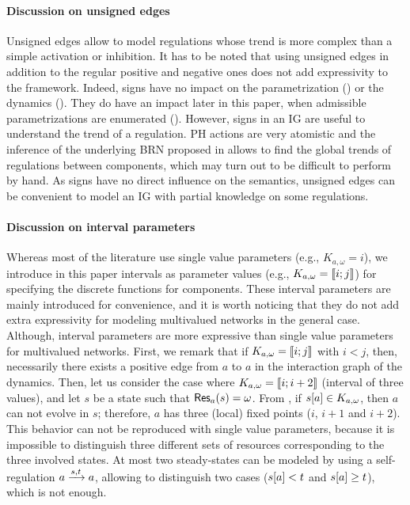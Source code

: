 \paragraph{Discussion on unsigned edges}
Unsigned edges allow to model regulations whose trend is more complex than a simple activation or inhibition.
It has to be noted that using unsigned edges in addition to the regular positive and negative ones does not add expressivity to the framework.
Indeed, signs have no impact on the parametrization () or the dynamics ().
They do have an impact later in this paper, when admissible parametrizations are enumerated ().
However, signs in an IG are useful to understand the trend of a regulation.
PH actions are very atomistic and the inference of the underlying BRN proposed in 
allows to find the global trends of regulations between components,
which may turn out to be difficult to perform by hand.
As signs have no direct influence on the semantics, unsigned edges can be convenient to model an IG with partial knowledge on some regulations.

\paragraph{Discussion on interval parameters}
Whereas most of the literature use single value parameters (e.g., $K_{a,\omega} = i$), we introduce
in this paper intervals as parameter values (e.g., $K_{a,\omega} = \llbracket i ; j \rrbracket$) for specifying
the discrete functions for components.
These interval parameters are mainly introduced for convenience, and it is worth noticing that they
do not add extra expressivity for modeling multivalued networks in the general case.
Although, interval parameters are more expressive than single value parameters for multivalued networks.
First, we remark that if  $K_{a,\omega} = \llbracket i ; j \rrbracket$ with $i < j$, then, necessarily there exists
a positive edge from $a$ to $a$ in the interaction graph of the dynamics.
Then, let us consider the case where $K_{a,\omega} = \llbracket i ; i+2 \rrbracket$ (interval of three values), and
let $s$ be a state such that $\mathsf{Res}_{a}(s) = \omega$.
From , if ${s[a]} \in K_{a,\omega}$, then $a$ can not evolve in $s$;
therefore, $a$ has three (local) fixed points ($i$, $i+1$ and $i+2$).
This behavior can not be reproduced with single value parameters, because it is impossible to distinguish three different sets of resources corresponding to the three involved states.
At most two steady-states can be modeled by using a self-regulation $a \xrightarrow{s, t} a$, allowing to distinguish two cases (${s[a]} < t$ and ${s[a]} \geq t$), which is not enough.

